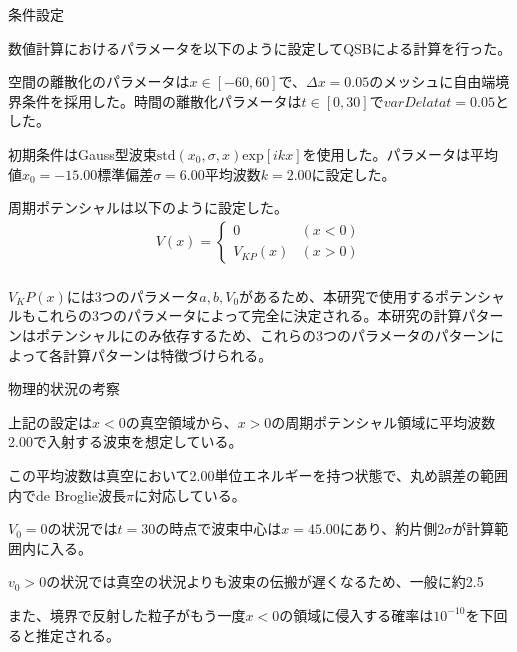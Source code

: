 \documentclass[a4paper, lualatex]{bxjsarticle}
\begin{document}
\begin{section}{条件設定}
    \par 数値計算におけるパラメータを以下のように設定してQSBによる計算を行った。
    \par 空間の離散化のパラメータは$x\in [-60, 60]$で、$\varDelta x=0.05$のメッシュに自由端境界条件を採用した。時間の離散化パラメータは$t\in [0, 30]$で$varDelata t=0.05$とした。
    \par 初期条件はGauss型波束$\mathrm{std}(x_0, \sigma, x)\mathrm{exp}[ikx]$を使用した。パラメータは平均値$x_0=-15.00$標準偏差$\sigma=6.00$平均波数$k=2.00$に設定した。
    \par 周期ポテンシャルは以下のように設定した。
    \begin{align}
     V(x)=\begin{cases}0&(x<0)\\V_{KP}(x)&(x>0)\end{cases}\nonumber\\
    \end{align}
    \par $V_KP(x)$には3つのパラメータ$a, b, V_0$があるため、本研究で使用するポテンシャルもこれらの3つのパラメータによって完全に決定される。本研究の計算パターンはポテンシャルにのみ依存するため、これらの3つのパラメータのパターンによって各計算パターンは特徴づけられる。
    \begin{subsection}{物理的状況の考察}
        \par 上記の設定は$x<0$の真空領域から、$x>0$の周期ポテンシャル領域に平均波数2.00で入射する波束を想定している。
        \par この平均波数は真空において2.00単位エネルギーを持つ状態で、丸め誤差の範囲内でde Broglie波長$\pi$に対応している。
        \par $V_0=0$の状況では$t=30$の時点で波束中心は$x=45.00$にあり、約片側$2\sigma$が計算範囲内に入る。
        \par $v_0>0$の状況では真空の状況よりも波束の伝搬が遅くなるため、一般に約2.5%
        \par また、境界で反射した粒子がもう一度$x<0$の領域に侵入する確率は$10^{-10}$を下回ると推定される。
    \end{subsection}
\end{section}
\end{document}
